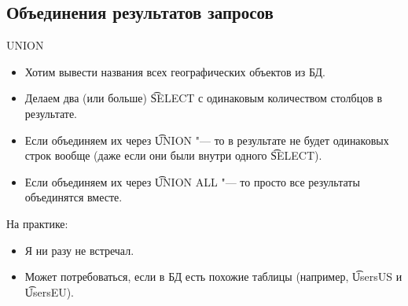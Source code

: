 \subsection{Объединения результатов запросов}

\begin{frame}{UNION}
	\begin{itemize}
		\item Хотим вывести названия всех географических объектов из БД.
		\item Делаем два (или больше) \t{SELECT} с одинаковым количеством столбцов в результате.
		\item Если объединяем их через \t{UNION} "--- то в результате не будет одинаковых строк вообще (даже если они были внутри одного \t{SELECT}).
		\item Если объединяем их через \t{UNION ALL} "--- то просто все результаты объединятся вместе.
	\end{itemize}
	На практике:
	\begin{itemize}
		\item Я ни разу не встречал.
		\item Может потребоваться, если в БД есть похожие таблицы (например, \t{UsersUS} и \t{UsersEU}).
	\end{itemize}
\end{frame}

